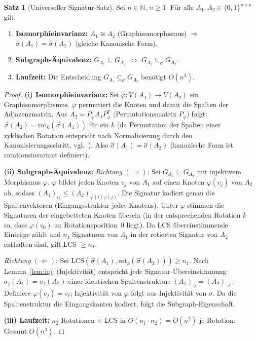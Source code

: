 ﻿\documentclass[a4paper,12pt]{article}
\theoremstyle{definition}
\newtheorem{satz}{Satz}
\begin{document}
\begin{satz}[Universeller Signatur-Satz]
\label{satz:universal}
Sei $n \in \mathbb{N}$, $n \geq 1$. F\"ur alle
$A_1, A_2 \in \{0,1\}^{n \times n}$ gilt:
\begin{enumerate}[label=(\roman*)]
    \item \textbf{Isomorphieinvarianz:}
    $A_1 \cong A_2$ (Graphisomorphismus) $\Rightarrow$
    $\hat{\sigma}(A_1) = \hat{\sigma}(A_2)$ (gleiche Kanonische Form).

    \item \textbf{Subgraph-\"Aquivalenz:}
    $G_{A_1} \subseteq G_{A_2}$ $\Leftrightarrow$
    $G_{A_1} \subseteq_\sigma G_{A_2}$.

    \item \textbf{Laufzeit:}
    Die Entscheidung $G_{A_1} \subseteq_\sigma G_{A_2}$ ben\"otigt $O(n^3)$.
\end{enumerate}
\end{satz}

\begin{proof}
\textbf{(i) Isomorphieinvarianz:}
Sei $\varphi: V(A_1) \to V(A_2)$ ein Graphisomorphismus.
$\varphi$ permutiert die Knoten und damit die Spalten der Adjazenzmatrix.
Aus $A_2 = P_\varphi A_1 P_\varphi^T$ (Permutationsmatrix $P_\varphi$) folgt:
$\vec{\sigma}(A_2) = \mathrm{rot}_k(\vec{\sigma}(A_1))$ f\"ur ein $k$
(da Permutation der Spalten einer zyklischen Rotation entspricht nach
Normalisierung durch den Kanonisierungsschritt, vgl.~\cite{epp2026subgraph}).
Also $\hat{\sigma}(A_1) = \hat{\sigma}(A_2)$
(kanonische Form ist rotationsinvariant definiert).

\textbf{(ii) Subgraph-\"Aquivalenz:}
\emph{Richtung} $(\Rightarrow)$:
Sei $G_{A_1} \subseteq G_{A_2}$ mit injektivem Morphismus $\varphi$.
$\varphi$ bildet jeden Knoten $v_j$ von $A_1$ auf einen Knoten $\varphi(v_j)$
von $A_2$ ab, sodass $(A_1)_{ij} \leq (A_2)_{\varphi(i)\varphi(j)}$.
Die Signatur kodiert genau die Spaltenvektoren (Eingangsstruktur jedes Knotens).
Unter $\varphi$ stimmen die Signaturen der eingebetteten Knoten \"uberein
(in der entsprechenden Rotation $k$ so, dass $\varphi(v_0)$ an Rotationsposition~0
liegt). Da LCS \"ubereinstimmende Eintr\"age z\"ahlt und $n_1$ Signaturen von
$A_1$ in der rotierten Signatur von $A_2$ enthalten sind,
gilt LCS $\geq n_1$.

\emph{Richtung} $(\Leftarrow)$:
Sei LCS$(\vec{\sigma}(A_1), \mathrm{rot}_k(\vec{\sigma}(A_2))) \geq n_1$.
Nach Lemma~\ref{lem:inj} (Injektivit\"at) entspricht jede
Signatur-\"Ubereinstimmung $\sigma_j(A_1) = \sigma_\ell(A_2)$ einer identischen
Spaltenstruktur: $(A_1)_{\cdot j} = (A_2)_{\cdot \ell}$.
Definiere $\varphi(v_j) = v_\ell$; Injektivit\"at von $\varphi$ folgt aus
Injektivit\"at von $\sigma$.
Da die Spaltenstruktur die Eingangskanten kodiert, folgt die Subgraph-Eigenschaft.

\textbf{(iii) Laufzeit:}
$n_2$ Rotationen $\times$ LCS in $O(n_1 \cdot n_2) = O(n^2)$ je Rotation:
Gesamt $O(n^3)$.
\end{proof}
\end{document}
